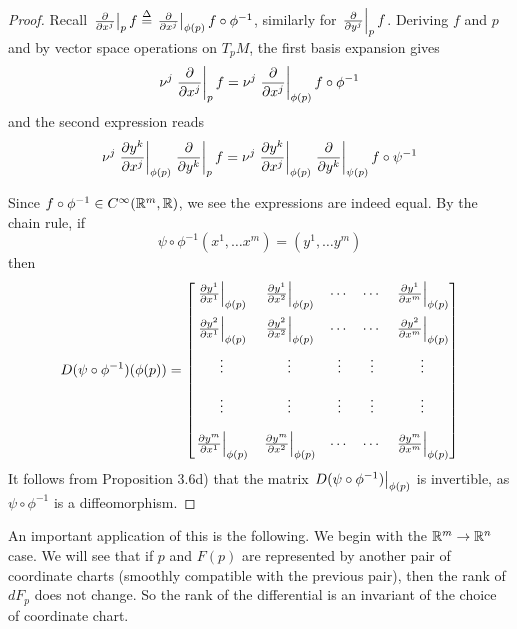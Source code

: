 \documentclass[../main-manifolds.tex]{subfiles}
\begin{document}
\begin{proof}
    Recall $\eval{\pdv{x^j}}_{p}f \defined \eval{\pdv{x^j}}_{\phi(p)} f\circ\phi^{-1}$, similarly for $\eval{\pdv{y^j}}_{p}f$. Deriving $f$ and $p$ and by vector space operations on $T_pM$, the first basis expansion gives
    \begin{equation}\label{lee-chap-1-basis-expansion-1}
        \nu^j\eval{\pdv{x^j}}_{p}f = \nu^j\eval{\pdv{x^j}}_{\phi(p)}f\circ\phi^{-1}
    \end{equation}
    and the second expression reads
    \begin{equation}\label{lee-chap-1-basis-expansion-2}
        \nu^j\eval{\pdv{y^k}{x^j}}_{\phi(p)}\eval{\pdv{y^k}}_p f = \nu^j\eval{\pdv{y^k}{x^j}}_{\phi(p)}\eval{\pdv{y^k}}_{\psi(p)}f\circ\psi^{-1}
    \end{equation}
    
    Since $f\circ\phi^{-1}\in \cinf[\realm,\real]$, we see the expressions are indeed equal. By the chain rule, if
    \[
        \psi\circ\phi^{-1}(x^1,\ldots x^m) = (y^1,\ldots y^m)
    \]
    then
    \[
        D(\psi\circ\phi^{-1})(\phi(p)) = \begin{bmatrix}\eval{\pdv{y^1}{x^1}}_{\phi(p)} & \eval{\pdv{y^1}{x^2}}_{\phi(p)} & \cdots & \cdots & \eval{\pdv{y^1}{x^m}}_{\phi(p)} \\[1em] \eval{\pdv{y^2}{x^1}}_{\phi(p)} & \eval{\pdv{y^2}{x^2}}_{\phi(p)} & \cdots & \cdots & \eval{\pdv{y^2}{x^m}}_{\phi(p)} \\[1em] \vdots & \vdots & \vdots & \vdots & \vdots \\[1em] \vdots & \vdots & \vdots & \vdots & \vdots \\[1em] \eval{\pdv{y^m}{x^1}}_{\phi(p)} & \eval{\pdv{y^m}{x^2}}_{\phi(p)} & \cdots & \cdots & \eval{\pdv{y^m}{x^m}}_{\phi(p)}\end{bmatrix}
    \]
    It follows from Proposition 3.6d) that the matrix $\eval{D(\psi\circ\phi^{-1})}_{\phi(p)}$ is invertible, as $\psi\circ\phi^{-1}$ is a diffeomorphism.
\end{proof}

An important application of this is the following. We begin with the ${\mathbb{R}^m}\to{\mathbb{R}^n}$ case. We will see that if $p$ and $F(p)$ are represented by another pair of coordinate charts (smoothly compatible with the previous pair), then the rank of $dF_p$ does not change. So the rank of the differential is an invariant of the choice of coordinate chart.
\end{document}
